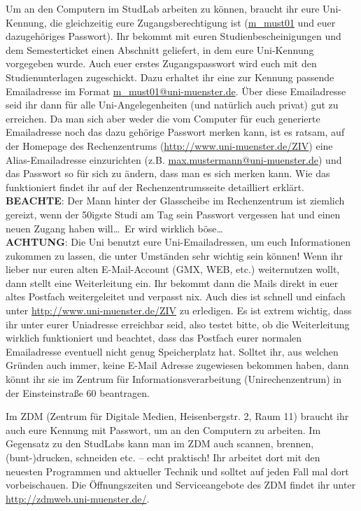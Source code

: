 Um an den Computern im StudLab arbeiten zu können, braucht ihr eure Uni-Kennung, die gleichzeitig eure Zugangsberechtigung ist (\url{m_must01} und euer dazugehöriges Passwort). Ihr bekommt mit euren Studienbescheinigungen und dem Semesterticket einen Abschnitt geliefert, in dem eure Uni-Kennung vorgegeben wurde. Auch euer erstes Zugangspasswort wird euch mit den Studienunterlagen zugeschickt. Dazu erhaltet ihr eine zur Kennung passende Emailadresse im Format  \url{m_must01@uni-muenster.de}. Über diese Emailadresse seid ihr dann für alle Uni-Angelegenheiten (und natürlich auch privat) gut zu erreichen. Da man sich aber weder die vom Computer für euch generierte Emailadresse noch das dazu gehörige Passwort merken kann, ist es ratsam, auf der Homepage des Rechenzentrums (\url{http://www.uni-muenster.de/ZIV}) eine Alias-Emailadresse einzurichten (z.B. \url{max.mustermann@uni-muenster.de}) und das Passwort so für sich zu ändern, dass man es sich merken kann. Wie das funktioniert ﬁndet ihr auf der Rechenzentrumsseite detailliert erklärt.\\ \textbf{BEACHTE}: Der Mann hinter der Glasscheibe im Rechenzentrum ist ziemlich gereizt, wenn der 50igste Studi am Tag sein Passwort vergessen hat und einen neuen Zugang haben will\dots \mbox{ }Er wird wirklich böse\dots \\
\textbf{ACHTUNG}: Die Uni benutzt eure Uni-Emailadressen, um euch Informationen zukommen zu lassen, die unter Umständen sehr wichtig sein können! Wenn ihr lieber nur euren alten E-Mail-Account (GMX, WEB, etc.) weiternutzen wollt, dann stellt eine Weiterleitung ein. Ihr bekommt dann die Mails direkt in euer altes Postfach weitergeleitet und verpasst nix. Auch dies ist schnell und einfach unter \url{http://www.uni-muenster.de/ZIV} zu erledigen. Es ist extrem wichtig, dass ihr unter eurer Uniadresse erreichbar seid, also testet bitte, ob die Weiterleitung wirklich funktioniert und beachtet, dass das Postfach eurer normalen Emailadresse eventuell nicht genug Speicherplatz hat. Solltet ihr, aus welchen Gründen auch immer, keine E-Mail Adresse zugewiesen bekommen haben, dann könnt ihr sie im Zentrum für Informationsverarbeitung (Unirechenzentrum) in der Einsteinstraße 60 beantragen.

Im ZDM (Zentrum für Digitale Medien, Heisenbergstr. 2, Raum 11) braucht ihr auch eure Kennung mit Passwort, um an den Computern zu arbeiten. Im Gegensatz zu den StudLabs kann man im ZDM auch scannen, brennen, (bunt-)drucken, schneiden etc. – echt praktisch! Ihr arbeitet dort mit den neuesten Programmen und aktueller Technik und solltet auf jeden Fall mal dort vorbeischauen. Die Öffnungszeiten und Serviceangebote des ZDM findet ihr unter \url{http://zdmweb.uni-muenster.de/}.
